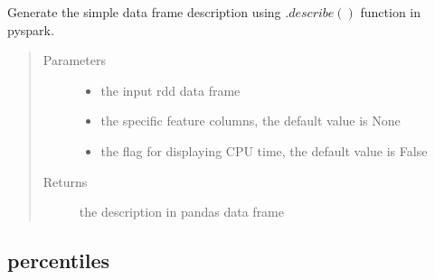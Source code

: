 \documentclass[letterpaper,12pt,english]{sphinxmanual}
\begin{document}
\begin{fulllineitems}
Generate the simple data frame description using \(.describe()\) function in pyspark.
\begin{quote}\begin{description}
\item[{Parameters}] \leavevmode\begin{itemize}
\item {} 
 \textendash{} the input rdd data frame

\item {} 
 \textendash{} the specific feature columns, the default value is None

\item {} 
 \textendash{} the flag for displaying CPU time, the default value is False

\end{itemize}

\item[{Returns}] \leavevmode
the description in pandas data frame

\end{description}\end{quote}

\end{fulllineitems}



\subsection{percentiles}
\label{\detokenize{basics:percentiles}}
\end{document}
